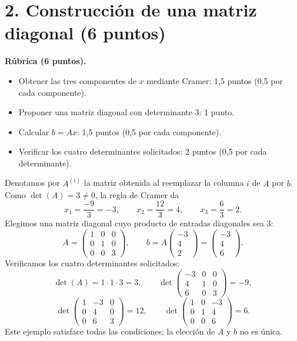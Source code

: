 \documentclass[10pt,a4]{examenEPN0}
\begin{document}
\section*{2. Construcción de una matriz diagonal (6 puntos)}
\noindent\textbf{Rúbrica (6 puntos).}
\begin{itemize}[itemsep=2pt]
    \item Obtener las tres componentes de $x$ mediante Cramer: 1,5 puntos
          (0,5 por cada componente).
    \item Proponer una matriz diagonal con determinante 3: 1 punto.
    \item Calcular $b=Ax$: 1,5 puntos (0,5 por cada componente).
    \item Verificar los cuatro determinantes solicitados: 2 puntos
          (0,5 por cada determinante).
\end{itemize}

Denotamos por $A^{(i)}$ la matriz obtenida al reemplazar la columna $i$
de $A$ por $b$. Como $\det(A)=3\ne0$, la regla de Cramer da
\[
    x_1=\frac{-9}{3}=-3,\qquad
    x_2=\frac{12}{3}=4,\qquad
    x_3=\frac{6}{3}=2.
\]
Elegimos una matriz diagonal cuyo producto de entradas diagonales sea 3:
\[
    \boxed{A=\begin{pmatrix}1&0&0\\0&1&0\\0&0&3\end{pmatrix},
    \qquad b=A\begin{pmatrix}-3\\4\\2\end{pmatrix}
    =\begin{pmatrix}-3\\4\\6\end{pmatrix}.}
\]
Verificamos los cuatro determinantes solicitados:
\[
    \det(A)=1\cdot1\cdot3=3,
    \qquad
    \det\begin{pmatrix}-3&0&0\\4&1&0\\6&0&3\end{pmatrix}=-9,
\]
\[
    \det\begin{pmatrix}1&-3&0\\0&4&0\\0&6&3\end{pmatrix}=12,
    \qquad
    \det\begin{pmatrix}1&0&-3\\0&1&4\\0&0&6\end{pmatrix}=6.
\]
Este ejemplo satisface todas las condiciones; la elección de $A$ y $b$
no es única.
\end{document}
